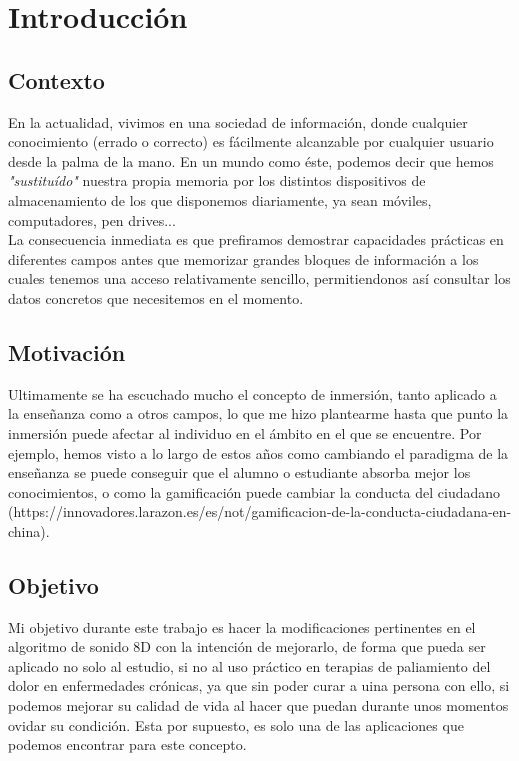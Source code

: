 \section{Introducción}

\subsection{Contexto}
\justify 
\quad En la actualidad, vivimos en una sociedad de información, donde cualquier conocimiento (errado o correcto) es fácilmente alcanzable por cualquier usuario desde la palma de la mano. En un mundo como éste, podemos decir que hemos \textit{"sustituído"} nuestra propia memoria por los distintos dispositivos de almacenamiento de los que disponemos diariamente, ya sean móviles, computadores, pen drives...\\
\quad La consecuencia inmediata es que prefiramos demostrar capacidades prácticas en diferentes campos antes que memorizar grandes bloques de información a los cuales tenemos una acceso relativamente sencillo, permitiendonos así consultar los datos concretos que necesitemos en el momento.\\

\subsection{Motivación}
\quad Ultimamente se ha escuchado mucho el concepto de inmersión, tanto aplicado a la enseñanza como a otros campos, lo que me hizo plantearme hasta que punto la inmersión puede afectar al individuo en el ámbito en el que se encuentre. Por ejemplo, hemos visto a lo largo de estos años como cambiando el paradigma de la enseñanza se puede conseguir que el alumno o estudiante absorba mejor los conocimientos, o como la gamificación puede cambiar la conducta del ciudadano (https://innovadores.larazon.es/es/not/gamificacion-de-la-conducta-ciudadana-en-china).\\


\subsection{Objetivo}
\quad Mi objetivo durante este trabajo es hacer la modificaciones pertinentes en el algoritmo de sonido 8D con la intención de mejorarlo, de forma que pueda ser aplicado no solo al estudio, si no al uso práctico en terapias de paliamiento del dolor en enfermedades crónicas, ya que sin poder curar a uina persona con ello, si podemos mejorar su calidad de vida al hacer que puedan durante unos momentos ovidar su condición.
\quad Esta por supuesto, es solo una de las aplicaciones que podemos encontrar para este concepto.\\

\newpage



